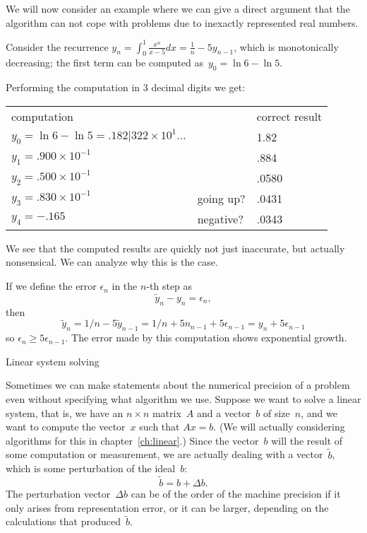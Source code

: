 We will now consider an example where we can give a direct argument
that the algorithm can not cope with problems due to inexactly
represented real numbers.

Consider the recurrence
$y_n=\int_0^1 \frac{x^n}{x-5}dx = \frac1n-5y_{n-1}$,
which is monotonically decreasing; the first term can
be computed as~$y_0=\ln 6 - \ln 5$.

Performing the computation in 3 decimal digits we get:

\begin{tabular}{lll}
  computation&&correct result\\
  $y_0=\ln 6 - \ln 5=.182|322\times 10^{1}\ldots$&&1.82\\
  $y_1=.900\times 10^{-1}$&&.884\\
  $y_2=.500\times 10^{-1}$&&.0580\\
  $y_3=.830\times 10^{-1}$&going up?&.0431\\
  $y_4=-.165$&negative?&.0343
\end{tabular}

We see that the computed results are quickly not just inaccurate, but
actually nonsensical. We can analyze why this is the case.

If we define the error $\epsilon_n$ in the $n$-th step as
\begin{equation}
  \tilde y_n-y_n=\epsilon_n,
\end{equation}then
\begin{equation}
  \tilde y_n=1/n-5\tilde y_{n-1}=1/n+5n_{n-1}+5\epsilon_{n-1}
  = y_n+5\epsilon_{n-1}
\end{equation}
so $\epsilon_n\geq 5\epsilon_{n-1}$. The error made by this
computation shows exponential growth.

 {Linear system solving}

Sometimes we can make statements about the numerical precision of a
problem even without specifying what algorithm we use. Suppose we want
to solve a linear system, that is, we have an $n\times n$ matrix~$A$
and a vector~$b$ of size~$n$, and we want to compute the vector~$x$
such that $Ax=b$. (We will actually considering algorithms for this in
chapter~\ref{ch:linear}.) Since the vector~$b$ will the result of some
computation or measurement, we are actually dealing with a
vector~$\tilde b$, which is some perturbation of the ideal~$b$:
\begin{equation}
  \tilde b =  b+\Delta b.
\end{equation}
The perturbation vector~$\Delta b$ can be of the order of the machine
precision if it only arises from representation error, or it can be
larger, depending on the calculations that produced~$\tilde b$.

